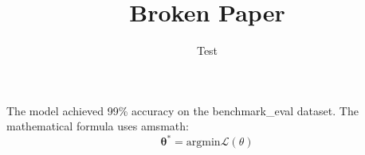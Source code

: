 \documentclass{article}
\begin{document}
\title{Broken Paper}
\author{Test}
\maketitle
The model achieved 99\% accuracy on the benchmark\_eval dataset.
The mathematical formula uses amsmath:
\begin{equation}
\boldsymbol{\theta}^* = \text{argmin} \mathcal{L}(\theta)
\end{equation}
\end{document}
